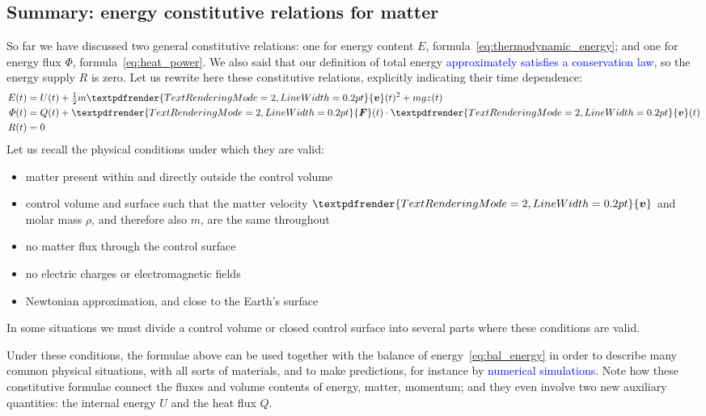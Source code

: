 \documentclass[a4paper,12pt,%
onecolumn,oneside,%
british%
]{memoir}
\renewcommand*{\bm}[1]{\textpdfrender{TextRenderingMode=2,LineWidth=0.2pt}{\boldsymbol{#1}}}
\renewcommand*{\|}[1][]{\nonscript\:#1\vert\nonscript\:\mathopen{}}
\newcommand*{\sect}{\S}%
\renewcommand*{\autoref}[2]{\sidepar{\vspace{-1ex}\footnotesize{\color{blue}\faIcon{%
angle-right%
}\enskip\sect~\ref{#1} page~\pageref{#1}}}\textcolor{blue}{#2}}
\newcommand*{\yv}{\bm{v}}
\newcommand*{\yrho}{\rho}
\newcommand*{\ym}{m}%
\newcommand*{\yE}{E}
\newcommand*{\yU}{U}
\newcommand*{\yH}{\varPhi}%
\newcommand*{\yQ}{Q}%
\newcommand*{\yR}{R}%
\newcommand*{\yF}{\bm{F}}
\begin{document}
\subsection{Summary: energy constitutive relations for matter}
\label{sec:summary_newton_energy}

So far we have discussed two general constitutive relations: one for energy content $\yE$, formula~\eqref{eq:thermodynamic_energy}; and one for energy flux $\yH$, formula~\eqref{eq:heat_power}. We also said that our definition of total energy \autoref{item:energy_no_supply}{approximately satisfies a conservation law}, so the energy supply $\yR$ is zero. Let us rewrite here these constitutive relations, explicitly indicating their time dependence:
\begin{equation*}
  \begin{aligned}
    \yE(t) &=  \yU(t) + \tfrac{1}{2}\ym \yv(t)^{2} + \ym g z(t)
    \\
    \yH(t) &= \yQ(t) + \yF(t)\cdot\yv(t)
    \\
    \yR(t) &= 0
  \end{aligned}
\end{equation*}
Let us recall the physical conditions under which they are valid:
\begin{itemize}[nosep]
\item matter present within and directly outside the control volume
\item control volume and surface such that the matter velocity $\yv$ and molar mass $\yrho$, and therefore also $\ym$, are the same throughout
\item no matter flux through the control surface
\item no electric charges or electromagnetic fields
\item Newtonian approximation, and close to the Earth's surface
\end{itemize}
\begin{warning}
In some situations we must divide a control volume or closed control surface into several parts where these conditions are valid.
\end{warning}


Under these conditions, the formulae above can be used together with the balance of energy~\eqref{eq:bal_energy} in order to describe many common physical situations, with all sorts of materials, and to make predictions, for instance by \autoref{sec:numeric_simulation}{numerical simulations}. Note how these constitutive formulae connect the fluxes and volume contents of energy, matter, momentum; and they even involve two new auxiliary quantities: the internal energy $\yU$ and the heat flux $\yQ$.
\end{document}
